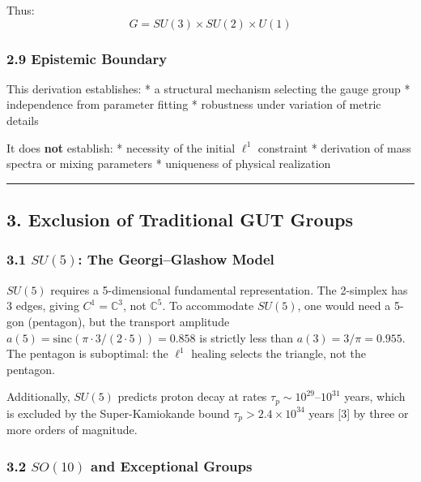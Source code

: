 \documentclass[
]{article}
\begin{document}
Thus: \[G = SU(3) \times SU(2) \times U(1)\]

\hypertarget{epistemic-boundary}{%
\subsubsection{2.9 Epistemic Boundary}\label{epistemic-boundary}}

This derivation establishes: * a structural mechanism selecting the
gauge group * independence from parameter fitting * robustness under
variation of metric details

It does \textbf{not} establish: * necessity of the initial \(\ell^1\)
constraint * derivation of mass spectra or mixing parameters *
uniqueness of physical realization

\begin{center}\rule{0.5\linewidth}{0.5pt}\end{center}

\hypertarget{exclusion-of-traditional-gut-groups}{%
\subsection{3. Exclusion of Traditional GUT
Groups}\label{exclusion-of-traditional-gut-groups}}

\hypertarget{su5-the-georgiglashow-model}{%
\subsubsection{\texorpdfstring{3.1 \(SU(5)\): The Georgi--Glashow
Model}{3.1 SU(5): The Georgi--Glashow Model}}\label{su5-the-georgiglashow-model}}

\(SU(5)\) requires a 5-dimensional fundamental representation. The
2-simplex has 3 edges, giving \(C^1 = \mathbb{C}^3\), not
\(\mathbb{C}^5\). To accommodate \(SU(5)\), one would need a 5-gon
(pentagon), but the transport amplitude
\(a(5) = \mathrm{sinc}(\pi \cdot 3/(2 \cdot 5)) = 0.858\) is strictly
less than \(a(3) = 3/\pi = 0.955\). The pentagon is suboptimal: the
\(\ell^1\) healing selects the triangle, not the pentagon.

Additionally, \(SU(5)\) predicts proton decay at rates
\(\tau_p \sim 10^{29}\)--\(10^{31}\) years, which is excluded by the
Super-Kamiokande bound \(\tau_p > 2.4 \times 10^{34}\) years {[}3{]} by
three or more orders of magnitude.

\hypertarget{so10-and-exceptional-groups}{%
\subsubsection{\texorpdfstring{3.2 \(SO(10)\) and Exceptional
Groups}{3.2 SO(10) and Exceptional Groups}}\label{so10-and-exceptional-groups}}
\end{document}
